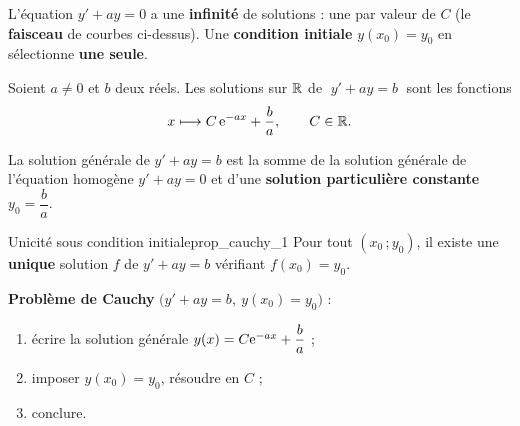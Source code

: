 \begin{center}
\end{center}

\begin{remarque}
	L'équation $y'+ay=0$ a une \textbf{infinité} de solutions : une par valeur
	de $C$ (le \textbf{faisceau} de courbes ci-dessus). Une \textbf{condition
	initiale} $y(x_0)=y_0$ en sélectionne \textbf{une seule}.
\end{remarque}

\begin{theoreme}[Équation complète $y'+ay=b$]
	Soient $a\neq 0$ et $b$ deux réels. Les solutions sur $\mathbb{R}$ de $\;y'+ay=b\;$
	sont les fonctions
	\[
	x\longmapsto C\,\mathrm{e}^{-ax}+\frac{b}{a},\qquad C\in\mathbb{R}.
	\]
\end{theoreme}

\begin{remarque}
	La solution générale de $y'+ay=b$ est la somme de la solution générale de
	l'équation homogène $y'+ay=0$ et d'une \textbf{solution particulière
	constante} $y_0=\dfrac{b}{a}$.
\end{remarque}

\begin{propriete}{Unicité sous condition initiale}{prop_cauchy_1}
	Pour tout $(x_0\,;y_0)$, il existe une \textbf{unique} solution $f$ de
	$y'+ay=b$ vérifiant $f(x_0)=y_0$.
\end{propriete}

\begin{methode}
	\textbf{Problème de Cauchy} $\bigl(y'+ay=b,\ y(x_0)=y_0\bigr)$ :
	\begin{enumerate}
		\item écrire la solution générale $y(x)=C\mathrm{e}^{-ax}+\dfrac{b}{a}$ ;
		\item imposer $y(x_0)=y_0$, résoudre en $C$ ;
		\item conclure.
	\end{enumerate}
\end{methode}

